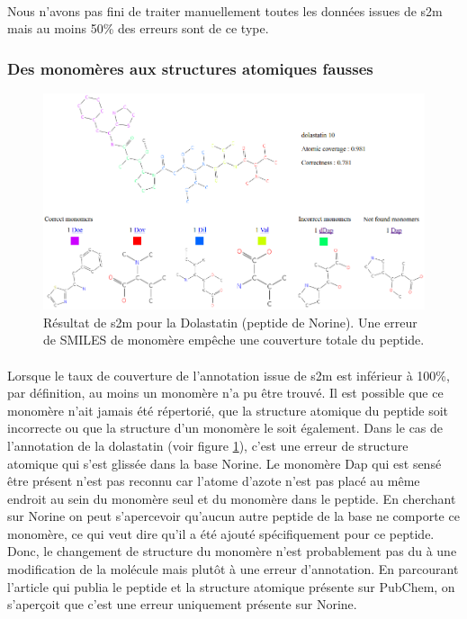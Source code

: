\documentclass[12pt,french,twoside]{report}
\begin{document}
\paragraph{}Nous n'avons pas fini de traiter manuellement toutes les données issues de s2m mais au moins 50\% des erreurs sont de ce type.


\subsubsection{Des monomères aux structures atomiques fausses}

\label{dolastatin_p}

\begin{figure}[h!]
  \begin{center}
    \includegraphics[width=450px]{Figures/s2m/results/dolastatin.png}
    \caption{\label{dolas}Résultat de s2m pour la Dolastatin (peptide de Norine).
    Une erreur de SMILES de monomère empêche une couverture totale du peptide.}
  \end{center}
\end{figure}

\paragraph{}Lorsque le taux de couverture de l'annotation issue de s2m est inférieur à 100\%, par définition, au moins un monomère n'a pu être trouvé.
Il est possible que ce monomère n'ait jamais été répertorié, que la structure atomique du peptide soit incorrecte ou que la structure d'un monomère le soit également.
Dans le cas de l'annotation de la dolastatin (voir figure \ref{dolas}), c'est une erreur de structure atomique qui s'est glissée dans la base Norine.
Le monomère Dap qui est sensé être présent n'est pas reconnu car l'atome d'azote n'est pas placé au même endroit au sein du monomère seul et du monomère dans le peptide.
En cherchant sur Norine on peut s'apercevoir qu'aucun autre peptide de la base ne comporte ce monomère, ce qui veut dire qu'il a été ajouté spécifiquement pour ce peptide.
Donc, le changement de structure du monomère n'est probablement pas du à une modification de la molécule mais plutôt à une erreur d'annotation.
En parcourant l'article qui publia le peptide et la structure atomique présente sur PubChem, on s'aperçoit que c'est une erreur uniquement présente sur Norine.
\end{document}
